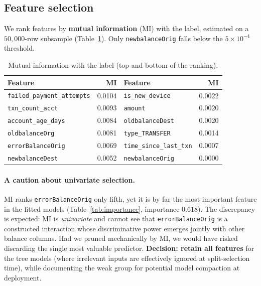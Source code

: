 \documentclass{article}
\begin{document}
\subsection{Feature selection}
\label{subsec:select}
We rank features by \textbf{mutual information} (MI) with the label,
estimated on a $50{,}000$-row subsample
(Table~\ref{tab:mi}). Only \texttt{newbalanceOrig} falls below the
$5\times10^{-4}$ threshold.

\begin{table}[H]
\centering
\caption{Mutual information with the label (top and bottom of the
ranking).}
\label{tab:mi}
\small
\begin{tabular}{lr@{\hskip 1.5cm}lr}
\toprule
Feature & MI & Feature & MI \\
\midrule
\texttt{failed\_payment\_attempts} & 0.0104 & \texttt{is\_new\_device}     & 0.0022 \\
\texttt{txn\_count\_acct}          & 0.0093 & \texttt{amount}              & 0.0020 \\
\texttt{account\_age\_days}        & 0.0084 & \texttt{oldbalanceDest}      & 0.0020 \\
\texttt{oldbalanceOrg}             & 0.0081 & \texttt{type\_TRANSFER}      & 0.0014 \\
\texttt{errorBalanceOrig}          & 0.0069 & \texttt{time\_since\_last\_txn} & 0.0007 \\
\texttt{newbalanceDest}            & 0.0052 & \texttt{newbalanceOrig}      & 0.0000 \\
\bottomrule
\end{tabular}
\end{table}

\paragraph{A caution about univariate selection.} MI ranks
\texttt{errorBalanceOrig} only fifth, yet it is by far the most
important feature in the fitted models
(Table~\ref{tab:importance}, importance $0.618$). The discrepancy is
expected: MI is \emph{univariate} and cannot see that
\texttt{errorBalanceOrig} is a constructed interaction whose
discriminative power emerges jointly with other balance columns. Had we
pruned mechanically by MI, we would have risked discarding the single
most valuable predictor. \textbf{Decision: retain all features} for the
tree models (where irrelevant inputs are effectively ignored at
split-selection time), while documenting the weak group for potential
model compaction at deployment.
\end{document}
